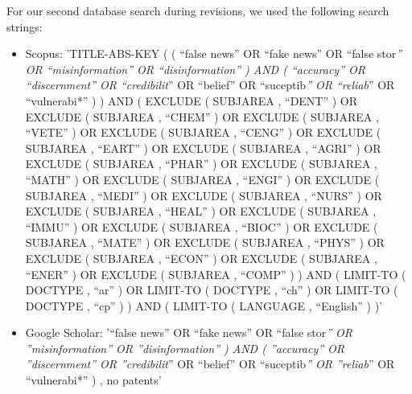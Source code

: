 \documentclass[
  doc,floatsintext]{apa6}
\begin{document}
For our second database search during revisions, we used the following search strings:

\begin{itemize}
\item
  Scopus:
  'TITLE-ABS-KEY ( ( ``false news'' OR ``fake news'' OR ``false stor\emph{'' OR ``misinformation'' OR ``disinformation'' ) AND ( ``accuracy'' OR ``discernment'' OR ``credibilit}'' OR ``belief'' OR ``suceptib\emph{'' OR ``reliab}'' OR ``vulnerabi*'' ) ) AND ( EXCLUDE ( SUBJAREA , ``DENT'' ) OR EXCLUDE ( SUBJAREA , ``CHEM'' ) OR EXCLUDE ( SUBJAREA , ``VETE'' ) OR EXCLUDE ( SUBJAREA , ``CENG'' ) OR EXCLUDE ( SUBJAREA , ``EART'' ) OR EXCLUDE ( SUBJAREA , ``AGRI'' ) OR EXCLUDE ( SUBJAREA , ``PHAR'' ) OR EXCLUDE ( SUBJAREA , ``MATH'' ) OR EXCLUDE ( SUBJAREA , ``ENGI'' ) OR EXCLUDE ( SUBJAREA , ``MEDI'' ) OR EXCLUDE ( SUBJAREA , ``NURS'' ) OR EXCLUDE ( SUBJAREA , ``HEAL'' ) OR EXCLUDE ( SUBJAREA , ``IMMU'' ) OR EXCLUDE ( SUBJAREA , ``BIOC'' ) OR EXCLUDE ( SUBJAREA , ``MATE'' ) OR EXCLUDE ( SUBJAREA , ``PHYS'' ) OR EXCLUDE ( SUBJAREA , ``ECON'' ) OR EXCLUDE ( SUBJAREA , ``ENER'' ) OR EXCLUDE ( SUBJAREA , ``COMP'' ) ) AND ( LIMIT-TO ( DOCTYPE , ``ar'' ) OR LIMIT-TO ( DOCTYPE , ``ch'' ) OR LIMIT-TO ( DOCTYPE , ``cp'' ) ) AND ( LIMIT-TO ( LANGUAGE , ``English'' ) )'
\item
  Google Scholar:
  '``false news'' OR ``fake news'' OR ``false stor\emph{'' OR ''misinformation'' OR ''disinformation'' ) AND ( ''accuracy'' OR ''discernment'' OR ''credibilit}'' OR ``belief'' OR ``suceptib\emph{'' OR ''reliab}'' OR ``vulnerabi*'' ) , no patents'
\end{itemize}
\end{document}
